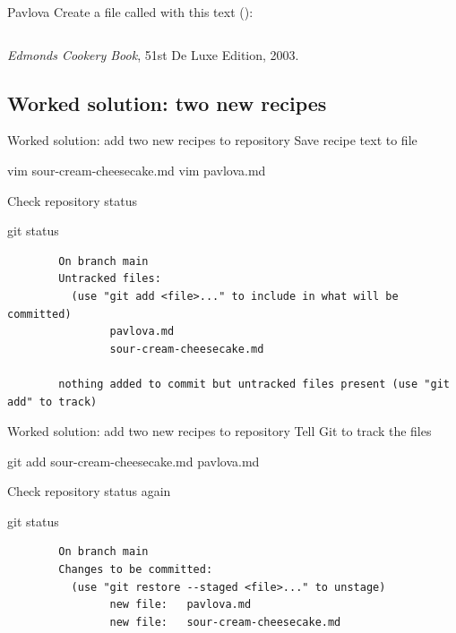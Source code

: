 \begin{frame}{Pavlova}
    Create a file called  with this text
    (\href{https://raw.githubusercontent.com/paultcochrane/git_course/refs/heads/master/git/examples/edmonds-pavlova.md}{}):
    \inputminted[fontsize=\tiny]{markdown}{examples/edmonds-pavlova.md}
    {\footnotesize \emph{Edmonds Cookery Book}, 51st De Luxe Edition, 2003.}
\end{frame}

\subsection{Worked solution: two new recipes}

\begin{frame}[fragile]{Worked solution: add two new recipes to repository}
    Save recipe text to file
    \begin{shellcode}
        vim sour-cream-cheesecake.md
        vim pavlova.md
    \end{shellcode}

    Check repository status
    \begin{shellcode}
        git status
    \end{shellcode}
    \begin{verbatim}
        On branch main
        Untracked files:
          (use "git add <file>..." to include in what will be committed)
                pavlova.md
                sour-cream-cheesecake.md

        nothing added to commit but untracked files present (use "git add" to track)
    \end{verbatim}
\end{frame}

\begin{frame}[fragile]{Worked solution: add two new recipes to repository}
    Tell Git to track the files
    \begin{shellcode}
        git add sour-cream-cheesecake.md pavlova.md
    \end{shellcode}

    Check repository status again
    \begin{shellcode}
        git status
    \end{shellcode}
    \begin{verbatim}
        On branch main
        Changes to be committed:
          (use "git restore --staged <file>..." to unstage)
                new file:   pavlova.md
                new file:   sour-cream-cheesecake.md
    \end{verbatim}
\end{frame}

